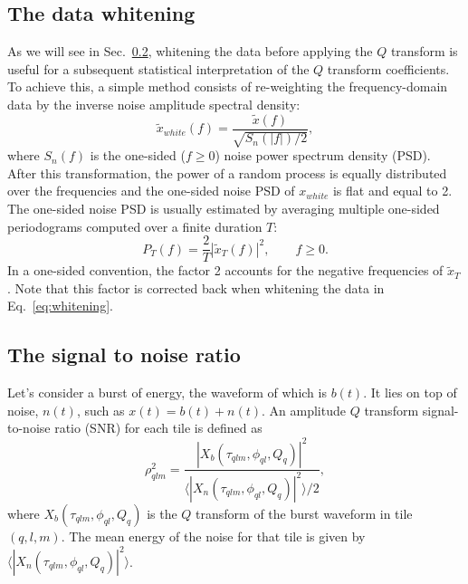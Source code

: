 \subsection{The data whitening} \label{sec:method:whitening}

As we will see in Sec.~\ref{sec:method:snr}, whitening the data before applying the $Q$ transform is useful for a subsequent statistical interpretation of the $Q$ transform coefficients. To achieve this, a simple method consists of re-weighting the frequency-domain data by the inverse noise amplitude spectral density:
\begin{equation}
  \tilde{x}_{white}(f) = \frac{\tilde{x}(f)}{\sqrt{S_n(|f|)/2}},
  \label{eq:whitening}
\end{equation}
where $S_n(f)$ is the one-sided ($f \ge 0$) noise power spectrum density (PSD). After this transformation, the power of a random process is equally distributed over the frequencies and the one-sided noise PSD of $x_{white}$ is flat and equal to 2. The one-sided noise PSD is usually estimated by averaging multiple one-sided periodograms computed over a finite duration $T$:
\begin{equation}
  P_T(f) = \frac{2}{T}\left|\tilde{x}_T(f)\right|^2, \qquad f \ge 0.
  \label{eq:periodogram}
\end{equation}
In a one-sided convention, the factor 2 accounts for the negative frequencies of $\tilde{x}_T$. Note that this factor is corrected back when whitening the data in Eq.~\ref{eq:whitening}.


\subsection{The signal to noise ratio} \label{sec:method:snr}

Let's consider a burst of energy, the waveform of which is $b(t)$. It lies on top of noise, $n(t)$, such as $x(t) = b(t) + n(t)$. An amplitude $Q$ transform signal-to-noise ratio (SNR) for each tile is defined as
\begin{equation}
  \rho_{qlm}^2 =  \frac{|X_b(\tau_{qlm}, \phi_{ql}, Q_q)|^2}{\langle |X_n(\tau_{qlm}, \phi_{ql}, Q_q)|^2 \rangle/2}, \label{eq:snrdef}
\end{equation}
where $X_b(\tau_{qlm}, \phi_{ql}, Q_q)$ is the $Q$ transform of the burst waveform in tile $(q,l,m)$. The mean energy of the noise for that tile is given by $\langle |X_n(\tau_{qlm}, \phi_{ql}, Q_q)|^2\rangle$.


